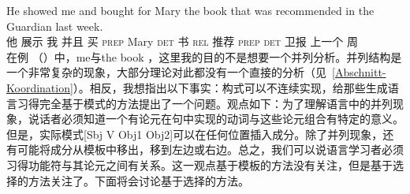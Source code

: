 \ea
\gll He showed me and bought for Mary the book that was recommended in the Guardian last week.\\
    他 展示 我 并且 买 \textsc{prep} Mary \textsc{det} 书 \textsc{rel} \passivepst{} 推荐 \textsc{prep} \textsc{det} 卫报 上一个 周\\
\z
在例 （）中，me与the book ，这里我的目的不是想要一个并列分析。并列结构是一个非常复杂的现象，大部分理论对此都没有一个直接的分析（见~\ref{Abschnitt-Koordination}）。相反，我想指出以下事实：构式可以不连续实现，给那些生成语言习得完全基于模式的方法提出了一个问题。观点如下：为了理解语言中的并列现象，说话者必须知道一个有论元在句中实现的动词与这些论元组合有特定的意义。但是，实际模式[Sbj V Obj1 Obj2]可以在任何位置插入成分。除了并列现象，还有可能将成分从模板中移出，移到左边或右边。总之，我们可以说语言学习者必须习得功能符与其论元之间有关系。这一观点基于模板的方法没有关注，但是基于选择的方法关注了。下面将会讨论基于选择的方法。

